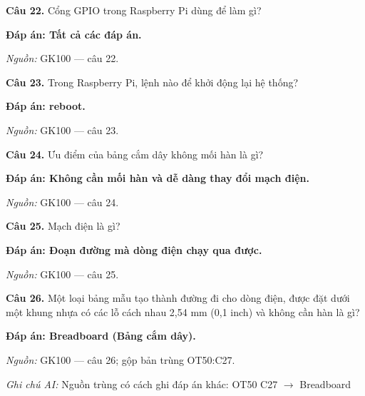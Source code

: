 \documentclass[11pt,a4paper]{article}
\begin{document}
\textbf{Câu 22.} Cổng GPIO trong Raspberry Pi dùng để làm gì?\par
{\color{answer}\textbf{Đáp án: Tất cả các đáp án.}}\par
{\footnotesize\color{sourcegray}\textit{Nguồn:} GK100 — câu 22.\par}
\vspace{3pt}\par\noindent{\color{black!18}\rule{\linewidth}{0.3pt}}\par\medskip

\textbf{Câu 23.} Trong Raspberry Pi, lệnh nào để khởi động lại hệ thống?\par
{\color{answer}\textbf{Đáp án: reboot.}}\par
{\footnotesize\color{sourcegray}\textit{Nguồn:} GK100 — câu 23.\par}
\vspace{3pt}\par\noindent{\color{black!18}\rule{\linewidth}{0.3pt}}\par\medskip

\textbf{Câu 24.} Ưu điểm của bảng cắm dây không mối hàn là gì?\par
{\color{answer}\textbf{Đáp án: Không cần mối hàn và dễ dàng thay đổi mạch điện.}}\par
{\footnotesize\color{sourcegray}\textit{Nguồn:} GK100 — câu 24.\par}
\vspace{3pt}\par\noindent{\color{black!18}\rule{\linewidth}{0.3pt}}\par\medskip

\textbf{Câu 25.} Mạch điện là gì?\par
{\color{answer}\textbf{Đáp án: Đoạn đường mà dòng điện chạy qua được.}}\par
{\footnotesize\color{sourcegray}\textit{Nguồn:} GK100 — câu 25.\par}
\vspace{3pt}\par\noindent{\color{black!18}\rule{\linewidth}{0.3pt}}\par\medskip

\textbf{Câu 26.} Một loại bảng mẫu tạo thành đường đi cho dòng điện, được đặt dưới một khung nhựa có các lỗ cách nhau 2,54 mm (0,1 inch) và không cần hàn là gì?\par
{\color{answer}\textbf{Đáp án: Breadboard (Bảng cắm dây).}}\par
{\footnotesize\color{sourcegray}\textit{Nguồn:} GK100 — câu 26; gộp bản trùng OT50:C27.\par}
{\footnotesize\color{sourcegray}\textit{Ghi chú AI:} Nguồn trùng có cách ghi đáp án khác: OT50 C27 \ensuremath{\rightarrow} Breadboard\par}
\vspace{3pt}\par\noindent{\color{black!18}\rule{\linewidth}{0.3pt}}\par\medskip
\end{document}
